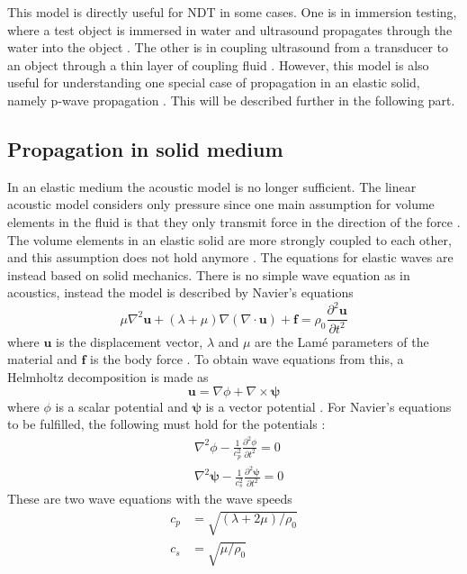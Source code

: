 \documentclass[11pt,twoside]{eitExjobb}
\begin{document}
	This model is directly useful for NDT in some cases. One is in immersion testing, where a test object is immersed in water and ultrasound propagates through the water into the object \cite{Schmerr2016}. The other is in coupling ultrasound from a transducer to an object through a thin layer of coupling fluid \cite{Schmerr2016}. However, this model is also useful for understanding one special case of propagation in an elastic solid, namely p-wave propagation \cite{Rossing2014}. This will be described further in the following part.
	
	\subsection{Propagation in solid medium}
	In an elastic medium the acoustic model is no longer sufficient. The linear acoustic model considers only pressure since one main assumption for volume elements in the fluid is that they only transmit force in the direction of the force \cite{Kaufman2000}. The volume elements in an elastic solid are more strongly coupled to each other, and this assumption does not hold anymore \cite{Kaufman2005}. The equations for elastic waves are instead based on solid mechanics. There is no simple wave equation as in acoustics, instead the model is described by Navier's equations
	\begin{equation*}
		\mu \nabla^2 \bm{u} + (\lambda+\mu) \nabla (\nabla \cdot \bm{u}) + \bm{f} = \rho_0 \frac{\partial^2 \bm{u}}{\partial t^2}
	\end{equation*}
	where $\bm{u}$ is the displacement vector, $\lambda$ and $\mu$ are the Lamé parameters of the material and $\bm{f}$ is the body force \cite{Schmerr2016}. To obtain wave equations from this, a Helmholtz decomposition is made as
	\begin{equation*}
		\bm{u} = \nabla \phi + \nabla \times \bm{\psi}
	\end{equation*}
	where $\phi$ is a scalar potential and $\bm{\psi}$ is a vector potential \cite{Schmerr2016}. For Navier's equations to be fulfilled, the following must hold for the potentials \cite{Schmerr2016}:
	\begin{align*}
		&\nabla^2 \phi - \frac{1}{c_p^2} \frac{\partial^2 \phi}{\partial t^2} = 0 \\
		&\nabla^2 \bm{\psi} - \frac{1}{c_s^2} \frac{\partial^2 \bm{\psi}}{\partial t^2} = 0
	\end{align*}
	These are two wave equations with the wave speeds \cite{Schmerr2016}
	\begin{align*}
		c_p &= \sqrt{(\lambda + 2\mu)/\rho_0} \\
		c_s &= \sqrt{\mu/\rho_0}
	\end{align*}
\end{document}
